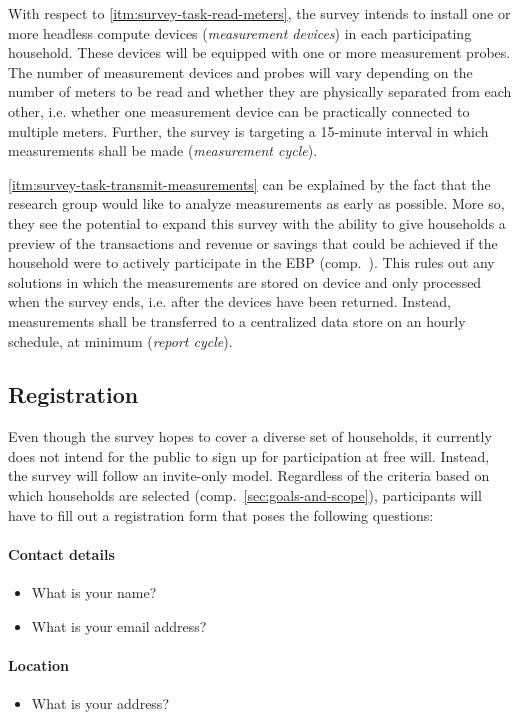 With respect to \ref{itm:survey-task-read-meters}, the survey intends to install one or more headless compute devices (\textit{measurement devices}) in each participating household. These devices will be equipped with one or more measurement probes. The number of measurement devices and probes will vary depending on the number of meters to be read and whether they are physically separated from each other, i.e. whether one measurement device can be practically connected to multiple meters. Further, the survey is targeting a 15-minute interval in which measurements shall be made (\textit{measurement cycle}).

\ref{itm:survey-task-transmit-measurements} can be explained by the fact that the research group would like to analyze measurements as early as possible. More so, they see the potential to expand this survey with the ability to give households a preview of the transactions and revenue or savings that could be achieved if the household were to actively participate in the \ac{EBP} (comp.~\cite[p.~63]{stoy2019broker}). This rules out any solutions in which the measurements are stored on device and only processed when the survey ends, i.e. after the devices have been returned. Instead, measurements shall be transferred to a centralized data store on an hourly schedule, at minimum (\textit{report cycle}).


\subsection{Registration}
\label{sec:survey-registration}

Even though the survey hopes to cover a diverse set of households, it currently does not intend for the public to sign up for participation at free will. Instead, the survey will follow an invite-only model. Regardless of the criteria based on which households are selected (comp.~\autoref{sec:goals-and-scope}), participants will have to fill out a registration form that poses the following questions:

\paragraph{Contact details}
\begin{itemize}
  \item What is your name?
  \item What is your email address?
\end{itemize}

\paragraph{Location}
\begin{itemize}
  \item What is your address?
\end{itemize}

